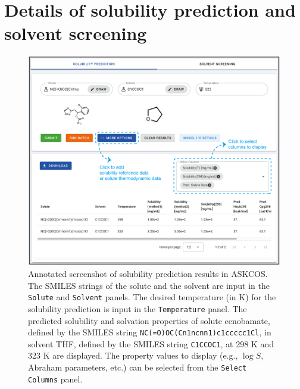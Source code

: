 \documentclass[pdflatex,sn-mathphys-num]{sn-jnl}%
\theoremstyle{thmstyleone}%
\theoremstyle{thmstyletwo}%
\theoremstyle{thmstylethree}%
\begin{document}

\maketitle

\section{Details of solubility prediction and solvent screening}\label{results_solubility}

\begin{figure}[h!]
\centering
\includegraphics[width=1.0\textwidth]{media/S1.Solubility_prediction.png}
\caption{Annotated screenshot of solubility prediction results in ASKCOS. The SMILES strings of the solute and the solvent are input in the \texttt{Solute} and \texttt{Solvent} panels. The desired temperature (in K) for the solubility prediction is input in the \texttt{Temperature} panel. The predicted solubility and solvation properties of solute cenobamate, defined by the SMILES string \texttt{NC(=O)OC(Cn1ncnn1)c1ccccc1Cl}, in solvent THF, defined by the SMILES string \texttt{C1CCOC1}, at 298 K and 323 K are displayed. The property values to display (e.g., $\log S$, Abraham parameters, etc.) can be selected from the \texttt{Select Columns} panel. }\label{fig_solubility_prediction}
\end{figure}
\end{document}
